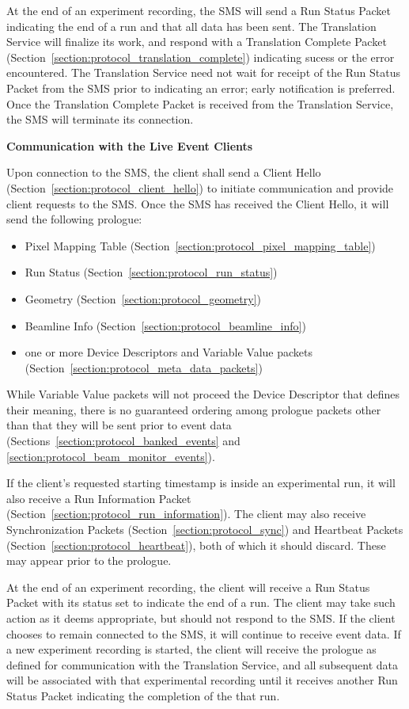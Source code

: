 At the end of an experiment recording, the SMS will send a Run Status Packet
indicating the end of a run and that all data has been sent. The Translation
Service will finalize its work, and respond with a Translation Complete Packet
(Section~\ref{section:protocol_translation_complete}) indicating sucess or the
error encountered.  The Translation Service need not wait for receipt of the
Run Status Packet from the SMS prior to indicating an error; early notification
is preferred.  Once the Translation Complete Packet is received from the
Translation Service, the SMS will terminate its connection.


{\large \bf Communication with the Live Event Clients}

Upon connection to the SMS, the client shall send a Client Hello
(Section~\ref{section:protocol_client_hello}) to initiate communication
and provide client requests to the SMS. Once the SMS has received the Client
Hello, it will send the following prologue:
\begin{itemize}
\item Pixel Mapping Table (Section~\ref{section:protocol_pixel_mapping_table})
\item Run Status (Section~\ref{section:protocol_run_status})
\item Geometry (Section~\ref{section:protocol_geometry})
\item Beamline Info (Section~\ref{section:protocol_beamline_info})
\item one or more Device Descriptors and Variable Value packets
(Section~\ref{section:protocol_meta_data_packets})
\end{itemize}
While Variable Value packets will not proceed the Device Descriptor that
defines their meaning, there is no guaranteed ordering among prologue
packets other than that they will be sent prior to event data
(Sections~\ref{section:protocol_banked_events} and
\ref{section:protocol_beam_monitor_events}).

If the client's requested starting timestamp is inside an experimental
run, it will also receive a Run Information Packet
(Section~\ref{section:protocol_run_information}).
The client may also receive Synchronization Packets
(Section~\ref{section:protocol_sync})
and Heartbeat Packets (Section~\ref{section:protocol_heartbeat}), both of
which it should discard. These may appear prior to the prologue.

At the end of an experiment recording, the client will receive a Run Status
Packet with its status set to indicate the end of a run.  The client may take
such action as it deems appropriate, but should not respond to the SMS. If the
client chooses to remain connected to the SMS, it will continue to receive
event data. If a new experiment recording is started, the client will receive
the prologue as defined for communication with the Translation Service, and all
subsequent data will be associated with that experimental recording until it
receives another Run Status Packet indicating the completion of the that run.

